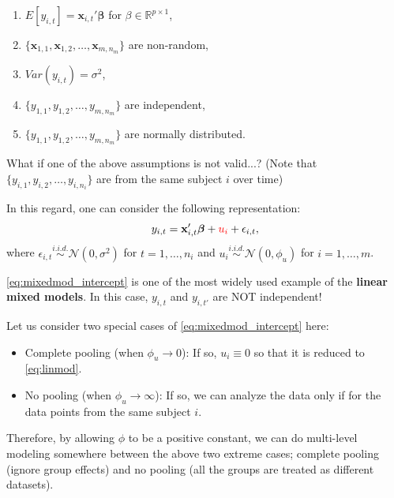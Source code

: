 \documentclass[ignorenonframetext,]{beamer}
\begin{document}
\begin{frame}[allowframebreaks]
\begin{enumerate}
	\item $E[y_{i,t}] = \mathbf{x}_{i,t}' \bm{\beta}$ for $\beta \in \mathbb{R}^{p \times 1}$,
	\item $ \{\mathbf{x}_{1,1}, \mathbf{x}_{1,2}, \ldots, \mathbf{x}_{m,n_m} \}$ are non-random,
	\item $Var(y_{i,t}) = \sigma^2$,
	\item {\color{red} $\{ y_{1,1}, y_{1,2}, \ldots, y_{m,n_m}  \}$ are independent,}
	\item $\{  y_{1,1}, y_{1,2}, \ldots, y_{m,n_m}   \}$ are normally distributed.
\end{enumerate}
What if one of the above assumptions is not valid...? (Note that $\{ y_{i,1}, y_{i,2}, \ldots, y_{i,n_i}  \}$ are from the same subject $i$ over time)

\framebreak
In this regard, one can consider the following representation:
\begin{equation} \label{eq:mixedmod_intercept}
y_{i,t} = \mathbf{x}_{i,t}'\bm{\beta} + {\color{red}u_i}+ \epsilon_{i,t},
\end{equation}
where $\epsilon_{i,t} \overset{i.i.d.}\sim \mathcal{N}(0, \sigma^2)$  for $t=1,\ldots, n_i$ and $u_i \overset{i.i.d.}\sim \mathcal{N}(0, \phi_u)$ for $i=1,\ldots, m$.

\vspace{8pt}
\eqref{eq:mixedmod_intercept} is one of the most widely used example of the \textbf{linear mixed models}. In this case, $y_{i,t}$ and $y_{i,t'}$ are NOT independent!


\framebreak

Let us consider two special cases of \eqref{eq:mixedmod_intercept} here:
\begin{itemize}
	\item Complete pooling (when $\phi_u \rightarrow 0$): If so, $u_i \equiv 0$ so that it is reduced to \eqref{eq:linmod}.
	\item No pooling (when $\phi_u \rightarrow \infty$): If so, we can analyze the data only if for the data points from the same subject $i$.
\end{itemize}

Therefore, by allowing $\phi$ to be a positive constant, we can do multi-level modeling somewhere between the above two extreme cases; complete pooling (ignore group effects) and no pooling (all the groups are treated as different datasets).

\end{frame}
\end{document}

